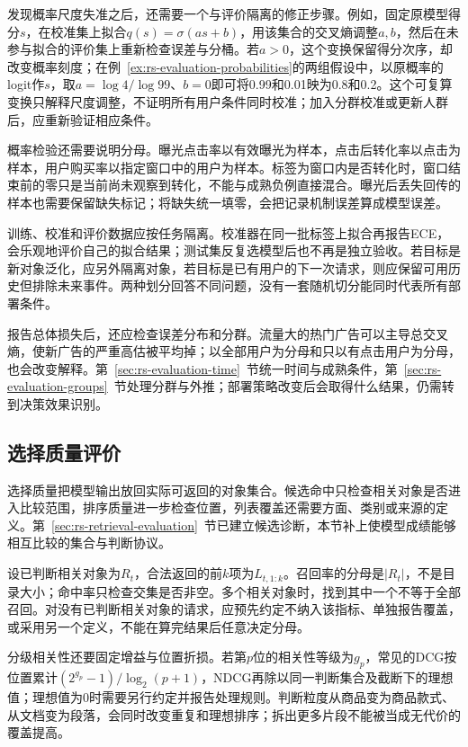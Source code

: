 发现概率尺度失准之后，还需要一个与评价隔离的修正步骤。例如，固定原模型得分$s$，在校准集上拟合$q(s)=\sigma(as+b)$，用该集合的交叉熵调整$a,b$，然后在未参与拟合的评价集上重新检查误差与分桶。若$a>0$，这个变换保留得分次序，却改变概率刻度；在例~\ref{ex:rs-evaluation-probabilities}的两组假设中，以原概率的logit作$s$，取$a=\log4/\log99$、$b=0$即可将0.99和0.01映为0.8和0.2。这个可复算变换只解释尺度调整，不证明所有用户条件同时校准；加入分群校准或更新人群后，应重新验证相应条件。

概率检验还需要说明分母。曝光点击率以有效曝光为样本，点击后转化率以点击为样本，用户购买率以指定窗口中的用户为样本。标签为窗口内是否转化时，窗口结束前的零只是当前尚未观察到转化，不能与成熟负例直接混合。曝光后丢失回传的样本也需要保留缺失标记；将缺失统一填零，会把记录机制误差算成模型误差。

训练、校准和评价数据应按任务隔离。校准器在同一批标签上拟合再报告ECE，会乐观地评价自己的拟合结果；测试集反复选模型后也不再是独立验收。若目标是新对象泛化，应另外隔离对象，若目标是已有用户的下一次请求，则应保留可用历史但排除未来事件。两种划分回答不同问题，没有一套随机切分能同时代表所有部署条件。

报告总体损失后，还应检查误差分布和分群。流量大的热门广告可以主导总交叉熵，使新广告的严重高估被平均掉；以全部用户为分母和只以有点击用户为分母，也会改变解释。第~\ref{sec:rs-evaluation-time}~节统一时间与成熟条件，第~\ref{sec:rs-evaluation-groups}~节处理分群与外推；部署策略改变后会取得什么结果，仍需转到决策效果识别。

\subsection{选择质量评价}
\label{sec:rs-evaluation-selection}

选择质量把模型输出放回实际可返回的对象集合。候选命中只检查相关对象是否进入比较范围，排序质量进一步检查位置，列表覆盖还需要方面、类别或来源的定义。第~\ref{sec:rs-retrieval-evaluation}~节已建立候选诊断，本节补上使模型成绩能够相互比较的集合与判断协议。

设已判断相关对象为$R_t$，合法返回的前$k$项为$L_{t,1:k}$。召回率的分母是$|R_t|$，不是目录大小；命中率只检查交集是否非空。多个相关对象时，找到其中一个不等于全部召回。对没有已判断相关对象的请求，应预先约定不纳入该指标、单独报告覆盖，或采用另一个定义，不能在算完结果后任意决定分母。

分级相关性还要固定增益与位置折损。若第$p$位的相关性等级为$g_p$，常见的DCG按位置累计$(2^{g_p}-1)/\log_2(p+1)$，NDCG再除以同一判断集合及截断下的理想值；理想值为0时需要另行约定并报告处理规则。判断粒度从商品变为商品款式、从文档变为段落，会同时改变重复和理想排序；拆出更多片段不能被当成无代价的覆盖提高。

